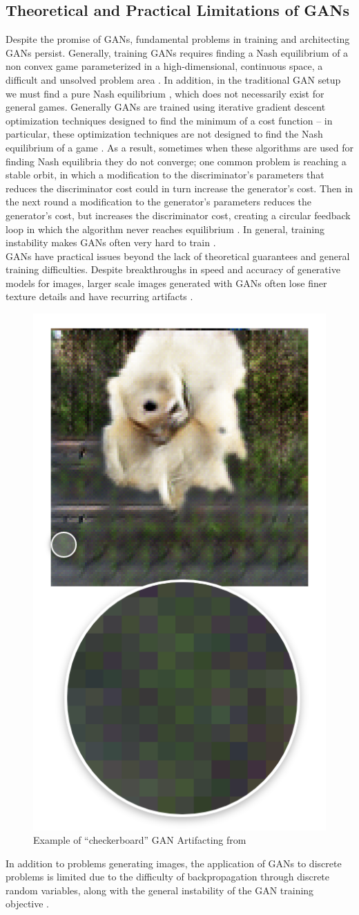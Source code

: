 \documentclass{article}
\begin{document}
\subsection{Theoretical and Practical Limitations of GANs}
Despite the promise of GANs, fundamental problems in training and architecting GANs persist. Generally, training GANs requires finding a Nash equilibrium of a non convex game parameterized in a high-dimensional, continuous space, a difficult and unsolved problem area \citep{Salimans2016}. In addition, in the traditional GAN setup we must find a pure Nash equilibrium \citep{Arora17}, which does not necessarily exist for general games. Generally GANs are trained using iterative gradient descent optimization techniques designed to find the minimum of a cost function – in particular, these optimization techniques are not designed to find the Nash equilibrium of a game \citep{Salimans2016}. As a result, sometimes when these algorithms are used for finding Nash equilibria they do not converge; one common problem is reaching a stable orbit, in which a modification to the discriminator's parameters that reduces the discriminator cost could in turn increase the generator’s cost. Then in the next round a modification to the generator’s parameters reduces the generator’s cost, but increases the discriminator cost, creating a circular feedback loop in which the algorithm never reaches equilibrium \citep{Salimans2016}. In general, training instability makes GANs often very hard to train \citep{DBLP:journals/corr/GulrajaniAADC17}.
\\
GANs have practical issues beyond the lack of theoretical guarantees and general training difficulties. Despite breakthroughs in speed and accuracy of generative models for images, larger scale images generated with GANs often lose finer texture details and have recurring artifacts \citep{DBLP:journals/corr/LedigTHCATTWS16} \citep{Salimans2016} \citep{DBLP:journals/corr/ShrivastavaPTSW16}.
\begin{figure}[H]
\centering
\includegraphics[width=.25\linewidth]{figures/artifacting_example.png}
\caption{Example of ``checkerboard'' GAN Artifacting from \citep{Salimans2016}}
\label{artefacting}
\end{figure}
In addition to problems generating images, the application of GANs to discrete problems is limited due to the difficulty of backpropagation through discrete random variables, along with the general instability of the GAN training objective \citep{Che+al-2017-augmented}. 
\end{document}
